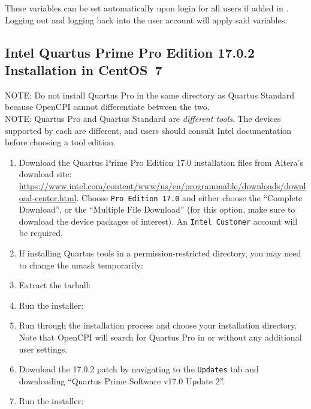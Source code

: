 \begin{flushleft}
These variables can be set automatically upon login for all users if added in . Logging out and logging back into the user account will apply said variables.

\end{flushleft}

\subsection{Intel Quartus Prime Pro Edition 17.0.2 Installation in CentOS~7}
\begin{flushleft}
	NOTE: Do not install Quartus Pro in the same directory as Quartus Standard because OpenCPI cannot differentiate between the two.\\
	NOTE: Quartus Pro and Quartus Standard are \textit{different tools}. The devices supported by each are different, and users should consult Intel documentation before choosing a tool edition.
\begin{enumerate}
	\item Download the Quartus Prime Pro Edition 17.0 installation files from Altera's download site: \url{https://www.intel.com/content/www/us/en/programmable/downloads/download-center.html}. Choose \verb+Pro Edition 17.0+ and either choose the ``Complete Download'', or the ``Multiple File Download'' (for this option, make sure to download the device packages of interest). An \verb+Intel Customer+ account will be required.
\item If installing Quartus tools in a permission-restricted directory, you may need to change the umask temporarily:\newline
{}\newline
{}
\item Extract the tarball:\newline
{}
\item Run the installer:\newline
{}\newline
\item Run through the installation process and choose your installation directory. Note that OpenCPI will search for Quartus Pro in  or  without any additional user settings.
\item Download the 17.0.2 patch by navigating to the \verb+Updates+ tab and downloading ``Quartus Prime Software v17.0 Update 2''.
\item Run the installer:\newline
\end{enumerate}


\end{flushleft}
